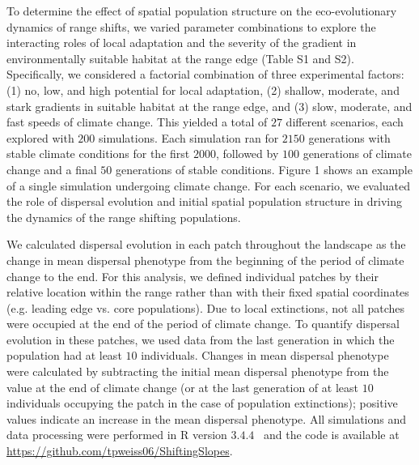 \documentclass[12pt, oneside]{article}
\begin{document}
To determine the effect of spatial population structure on the eco-evolutionary dynamics of range shifts, we varied parameter combinations to explore the interacting roles of local adaptation and the severity of the gradient in environmentally suitable habitat at the range edge (Table S1 and S2). Specifically, we considered a factorial combination of three experimental factors: (1) no, low, and high potential for local adaptation, (2) shallow, moderate, and stark gradients in suitable habitat at the range edge, and (3) slow, moderate, and fast speeds of climate change. This yielded a total of $27$ different scenarios, each explored with $200$ simulations. Each simulation ran for $2150$ generations with stable climate conditions for the first $2000$, followed by $100$ generations of climate change and a final $50$ generations of stable conditions. Figure 1 shows an example of a single simulation undergoing climate change. For each scenario, we evaluated the role of dispersal evolution and initial spatial population structure in driving the dynamics of the range shifting populations. 

We calculated dispersal evolution in each patch throughout the landscape as the change in mean dispersal phenotype from the beginning of the period of climate change to the end. For this analysis, we defined individual patches by their relative location within the range rather than with their fixed spatial coordinates (e.g. leading edge vs. core populations). Due to local extinctions, not all patches were occupied at the end of the period of climate change. To quantify dispersal evolution in these patches, we used data from the last generation in which the population had at least $10$ individuals. Changes in mean dispersal phenotype were calculated by subtracting the initial mean dispersal phenotype from the value at the end of climate change (or at the last generation of at least $10$ individuals occupying the patch in the case of population extinctions); positive values indicate an increase in the mean dispersal phenotype. All simulations and data processing were performed in R version $3.4.4$~\citep{team2000r} and the code is available at \url{https://github.com/tpweiss06/ShiftingSlopes}.
\end{document}

